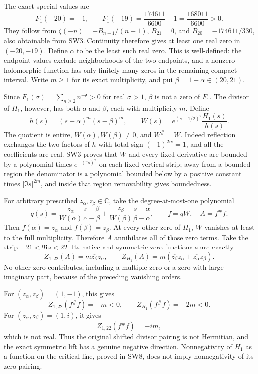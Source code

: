 \documentclass[
  10pt,
  a4paper,
]{article}
\begin{document}
The exact special values are \[
F_1(-20)=-1,\qquad
F_1(-19)=\frac{174611}{6600}-1=\frac{168011}{6600}>0.
\tag{SW28}
\] They follow from \(\zeta(-n)=-B_{n+1}/(n+1)\), \(B_{21}=0\), and
\(B_{20}=-174611/330\), also obtainable from SW3. Continuity therefore
gives at least one real zero in \((-20,-19)\). Define \(\alpha\) to be
the least such real zero. This is well-defined: the endpoint values
exclude neighborhoods of the two endpoints, and a nonzero holomorphic
function has only finitely many zeros in the remaining compact interval.
Write \(m\ge1\) for its exact multiplicity, and put
\(\beta=1-\alpha\in(20,21)\).

Since \(F_1(\sigma)=\sum_{n\ge2}n^{-\sigma}>0\) for real \(\sigma>1\),
\(\beta\) is not a zero of \(F_1\). The divisor of \(H_1\), however, has
both \(\alpha\) and \(\beta\), each with multiplicity \(m\). Define \[
h(s)=(s-\alpha)^m(s-\beta)^m,\qquad
W(s)=e^{(s-1/2)^2}\frac{H_1(s)}{h(s)}.
\tag{SW29}
\] The quotient is entire, \(W(\alpha),W(\beta)\ne0\), and \(W^\#=W\).
Indeed reflection exchanges the two factors of \(h\) with total sign
\((-1)^{2m}=1\), and all the coefficients are real. SW3 proves that
\(W\) and every fixed derivative are bounded by a polynomial times
\(e^{-(\Im s)^2}\) on each fixed vertical strip; away from a bounded
region the denominator is a polynomial bounded below by a positive
constant times \(|\Im s|^{2m}\), and inside that region removability
gives boundedness.

For arbitrary prescribed \(z_\alpha,z_\beta\in\mathbb C\), take the
degree-at-most-one polynomial \[
q(s)=\frac{z_\alpha}{W(\alpha)}\frac{s-\beta}{\alpha-\beta}
+\frac{z_\beta}{W(\beta)}\frac{s-\alpha}{\beta-\alpha},
\qquad f=qW,\quad A=f^\#f.
\tag{SW30}
\] Then \(f(\alpha)=z_\alpha\) and \(f(\beta)=z_\beta\). At every other
zero of \(H_1\), \(W\) vanishes at least to the full multiplicity.
Therefore \(A\) annihilates all of those zero terms. Take the strip
\(-21<\Re s<22\). Its native and symmetric zero functionals are exactly
\[
Z_{1,22}(A)=m\overline{z_\beta}z_\alpha,
\qquad
Z_{H_1}(A)=m(\overline{z_\beta}z_\alpha+\overline{z_\alpha}z_\beta).
\tag{SW31}
\] No other zero contributes, including a multiple zero or a zero with
large imaginary part, because of the preceding vanishing orders.

For \((z_\alpha,z_\beta)=(1,-1)\), this gives \[
\boxed{Z_{1,22}(f^\#f)=-m<0,\qquad Z_{H_1}(f^\#f)=-2m<0.}
\tag{SW32}
\] For \((z_\alpha,z_\beta)=(1,i)\), it gives \[
\boxed{Z_{1,22}(f^\#f)=-im,}
\tag{SW33}
\] which is not real. Thus the original shifted divisor pairing is not
Hermitian, and the exact symmetric lift has a genuine negative
direction. Nonnegativity of \(H_1\) as a function on the critical line,
proved in SW8, does not imply nonnegativity of its zero pairing.
\end{document}
